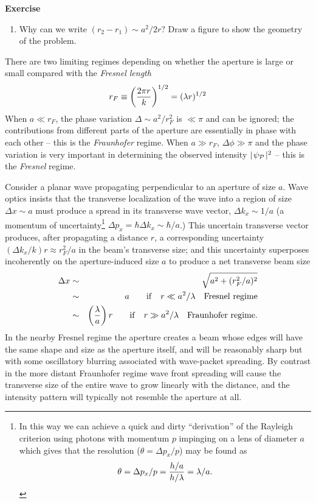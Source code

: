\documentclass{article}
\newcommand{\bua}{\begin{eqnarray*}}
\newcommand{\eua}{\end{eqnarray*}}
\def\cl#1{{\cal #1}}               %
\def\labs{\mid\!}
\def\rabs{\!\mid}
\begin{document}
{\bf Exercise}

\begin{enumerate}
\setcounter{enumi}{\value{count}}
\item Why can we write $(r_2-r_1)\sim a^2/2r$? Draw a figure to show
  the geometry of the problem.
\setcounter{count}{\value{enumi}} 
\end{enumerate}

There are
two limiting regimes depending on whether the aperture is large or small compared with the 
{\it Fresnel length}
\[
r_{F}\equiv\left({2\pi r\over k}\right)^{1/2}=(\lambda r)^{1/2}
\]
When $a\ll r_{F}$, the phase variation $\Delta\sim {a^2/r_{F}^2}$ is $\ll \pi$ and can be 
ignored; the contributions from different parts of the aperture are essentially in phase with
each other -- this is the {\it Fraunhofer} regime. When $a\gg r_{F}$, $\Delta\phi\gg \pi$ and the 
phase variation is very important in determining the observed intensity 
$\labs\psi_\cl{P}\rabs^2$ -- this is the {\it Fresnel} regime.

Consider a planar wave propagating perpendicular to an aperture of size $a$. 
Wave optics insists that the transverse localization of the wave into a region of size
$\Delta x\sim a$ must produce a spread in its transverse wave vector, $\Delta k_x\sim{1/a}$
(a momentum of uncertainty\footnote{In this way
we can achieve a quick and dirty ``derivation'' of the Rayleigh criterion using photons with
momentum $p$ impinging on a lens of diameter $a$ which gives that the resolution 
($\theta=\Delta p_x/p$) may be found as 
\[
\theta={\Delta p_x/p}={{h/a}\over{h/\lambda}}={\lambda/a}.
\]} $\Delta p_x=\hbar\Delta k_x\sim{\hbar/a}$.)
This uncertain transverse vector produces, after propagating a distance $r$,
a corresponding uncertainty $({\Delta k_x/k})r\approx {r_{F}^2/a}$ in the beam's transverse 
size; and this uncertainty superposes incoherently on the aperture-induced size $a$ to 
produce a net transverse beam size 
\bua
\Delta x&\sim&\sqrt{a^2+({r_{F}^2/a})^2} \\
        &\sim&a\qquad{\rm if}\quad r\ll {a^2/\lambda}\quad{\rm Fresnel~regime} \\
        &\sim&\left({\lambda\over a}\right)r\qquad{\rm if}\quad r\gg {a^2/\lambda}\quad{\rm Fraunhofer~regime}.
\eua
In the nearby Fresnel regime the aperture creates a beam whose edges will have the same shape and
size as the aperture itself, and will be reasonably sharp but with some oscillatory blurring
associated with wave-packet spreading. By contrast in the more distant Fraunhofer regime wave
front spreading will cause the transverse size of the entire wave to grow linearly with the 
distance, and the intensity pattern will typically not resemble the aperture at all.
\end{document}
